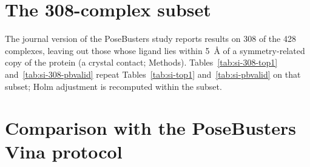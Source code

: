 \documentclass[11pt]{article}
\begin{document}
\begin{table}[h]
  \centering
  \caption{Complexes whose top-1 outcome differs between each arm and its baseline. For
    Vina, whose baseline was repeated with four seeds, the ratio is to the mean number of
    complexes that differ between two seeds (17.5).}
  \label{tab:si-flips}
  \small
  
\end{table}

\clearpage
\section{The 308-complex subset}

The journal version of the PoseBusters study reports results on 308 of the 428 complexes,
leaving out those whose ligand lies within \SI{5}{\angstrom} of a symmetry-related copy of
the protein (a crystal contact; Methods). Tables~\ref{tab:si-308-top1}
and~\ref{tab:si-308-pbvalid} repeat Tables~\ref{tab:si-top1} and~\ref{tab:si-pbvalid} on
that subset; Holm adjustment is recomputed within the subset.

\begin{table}[h]
  \centering
  \caption{Top-1 success for every engine and arm on the 308-complex subset.}
  \label{tab:si-308-top1}
  \small
  \setlength{\tabcolsep}{3.5pt}
  
\end{table}

\begin{table}[h]
  \centering
  \caption{\pbvalid{} success for every engine and arm on the 308-complex subset.}
  \label{tab:si-308-pbvalid}
  \small
  \setlength{\tabcolsep}{3.5pt}
  
\end{table}

\clearpage
\section{Comparison with the PoseBusters Vina protocol}
\end{document}
